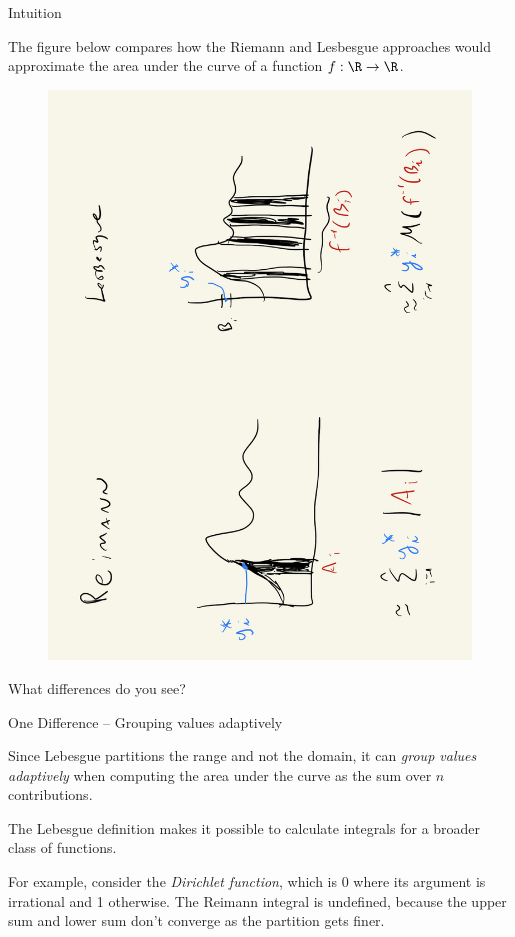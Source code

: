 \documentclass[10pt]{beamer}
\begin{document}
\begin{frame}{Intuition}

The figure below compares how the Riemann and Lesbesgue approaches would approximate the area under the curve of a function $f : \R \to \R$. 

\begin{figure}[H]
\centering 
\includegraphics[width=.6\textwidth, angle=270]{images/lesbesgue_vs_reimann}
\end{figure}
\end{frame}



\begin{frame}[standout]{}
What differences do you see?
\end{frame}

\begin{frame}{One Difference -- Grouping values adaptively}

Since Lebesgue partitions the range and not the domain, it can \textit{group values adaptively} when computing the area under the curve as the sum over $n$ contributions.  


The Lebesgue definition makes it possible to calculate integrals for a broader class of functions. 

For example, consider the \textit{Dirichlet function}, which is 0 where its argument is irrational and 1 otherwise.  The Reimann integral is undefined, because the upper sum and lower sum don't converge as the partition gets finer.

\end{frame}
\end{document}
